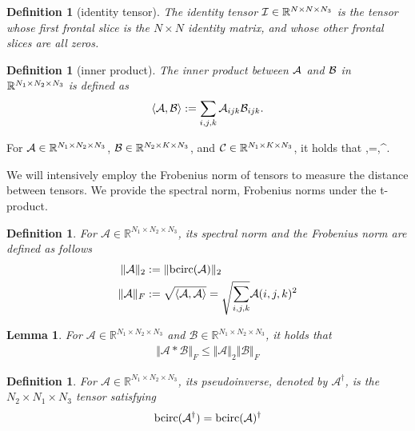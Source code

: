 \documentclass[11pt]{article}
\newtheorem{definition}[theorem]{Definition}
\newtheorem{lemma}[theorem]{Lemma}
\def\fm#1{\mathcal{#1}}
\def\r{\mathbb{R}}
\begin{document}
\begin{definition}[identity tensor]
 The identity tensor $\mathcal I\in\mathbb R^{N\times N\times N_3}$ is the tensor whose first frontal slice is the $N\times N$ identity matrix, and whose other frontal slices are all zeros.	
\end{definition}

\begin{definition}[inner product]
The inner product between $\mathcal A$ and $\mathcal B$ in $\mathbb R^{N_1\times N_2\times N_3}$ is defined as $$\langle\mathcal A,\mathcal B\rangle:=\sum_{i,j,k}\mathcal A_{ijk}\mathcal B_{ijk}.$$ 
\end{definition}

For $\mathcal A\in\mathbb R^{N_1\times N_2\times N_3}$, $\mathcal B\in\mathbb R^{N_2\times K\times N_3}$, and $\mathcal C\in\mathbb R^{N_1\times K\times N_3}$, it holds that \beq\label{tran}\la\mcala*\mcalb,\mcalc\ra=\la\mcalb,\mcala^\top*\mcalc\ra.\eeq

We will intensively employ the Frobenius norm of tensors to measure the distance between tensors. We  provide the spectral norm, Frobenius norms under the t-product.
\begin{definition}  For $\fm A \in \r^{N_1 \times N_2 \times N_3}$, its spectral norm and the Frobenius norm are defined as follows
\begin{align}
    \Vert \fm A \Vert_2 &  := \Vert \bcirc (\fm A ) \Vert_2\\
    \Vert \fm A \Vert_F &:= \sqrt{\langle \fm A , \fm A \rangle} = \sqrt{\sum_{i,j,k}}\fm A(i,j,k)^2
\end{align}
\end{definition}
\begin{lemma}
    For $\fm A\in \r^{N_1\times N_2 \times N_3}$ and $\fm B\in \r^{N_1\times N_2 \times N_3}$, it holds that 
    \begin{align}
        \Vert \fm A * \fm B \Vert_F\leq \Vert \fm A \Vert_2 \Vert \fm B \Vert_F
    \end{align}
\end{lemma}
\begin{definition} For $\fm A\in \r^{N_1\times N_2\times N_3}$, its pseudoinverse, denoted by $\fm A^\dagger$, is the $N_2\times N_1\times N_3$ tensor satisfying
\begin{align}
    \bcirc(\fm A^\dagger) = \bcirc(\fm A )^\dagger
\end{align}
\end{definition}
\end{document}
